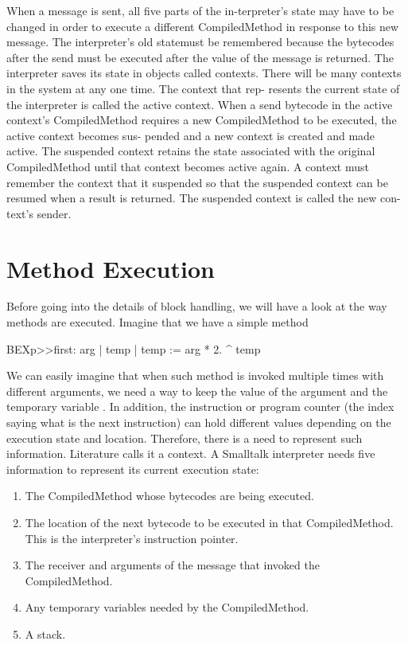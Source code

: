 \documentclass[a4paper,10pt,twoside]{book}
\begin{document}
When a message is sent, all five parts of the in-terpreter's state may have to be changed in order to execute a different CompiledMethod in response to this new message. The interpreter's old statemust be remembered because the bytecodes after the send must be executed after the value of the message is returned.
The interpreter saves its state in objects called contexts. There will be many contexts in the system at any one time. The context that rep- resents the current state of the interpreter is called the active context. When a send bytecode in the active context's CompiledMethod requires a new CompiledMethod to be executed, the active context becomes sus- pended and a new context is created and made active. The suspended context retains the state associated with the original CompiledMethod until that context becomes active again. A context must remember the context that it suspended so that the suspended context can be resumed when a result is returned. The suspended context is called the new con- text's sender.




\section{Method Execution}
Before going into the details of block handling, we will have a look at the way methods are executed. Imagine that we have 
a simple method 

\begin{code}{}
BEXp>>first: arg
	| temp | 	
	temp := arg * 2.
	^ temp
\end{code}

We can easily imagine that when such method is invoked multiple times with different arguments, we need a way to keep 
the value of the argument  and the temporary variable . In addition, the instruction or program counter (the index saying what is the next instruction) can hold different values depending on the execution state and location. Therefore, there is a need to represent such information. Literature calls it a context. A Smalltalk interpreter needs five information to represent its current execution state:
\begin{enumerate}
\item The CompiledMethod whose bytecodes are being executed.
\item The location of the next bytecode to be executed in that
CompiledMethod. This is the interpreter's instruction pointer.
\item The receiver and arguments of the message that invoked the
CompiledMethod.
\item Any temporary variables needed by the CompiledMethod.
\item A stack.
\end{enumerate}
\end{document}

